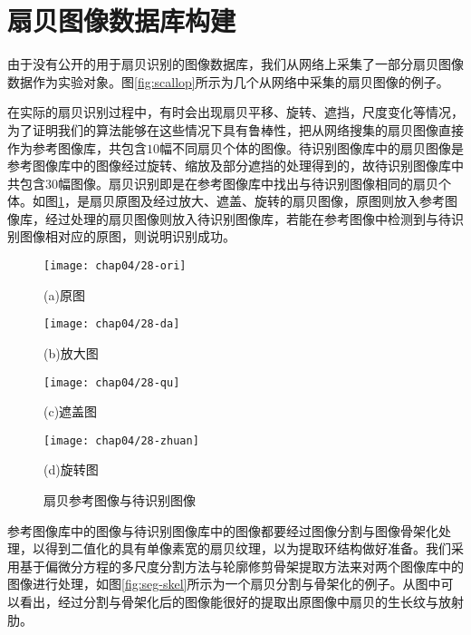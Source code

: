 \section{扇贝图像数据库构建}
\label{}
由于没有公开的用于扇贝识别的图像数据库，我们从网络上采集了一部分扇贝图像数据作为实验对象。图\ref{fig:scallop}所示为几个从网络中采集的扇贝图像的例子。

在实际的扇贝识别过程中，有时会出现扇贝平移、旋转、遮挡，尺度变化等情况，为了证明我们的算法能够在这些情况下具有鲁棒性，把从网络搜集的扇贝图像直接作为参考图像库，共包含$10$幅不同扇贝个体的图像。待识别图像库中的扇贝图像是参考图像库中的图像经过旋转、缩放及部分遮挡的处理得到的，故待识别图像库中共包含$30$幅图像。扇贝识别即是在参考图像库中找出与待识别图像相同的扇贝个体。如图\ref{fig:process}，是扇贝原图及经过放大、遮盖、旋转的扇贝图像，原图则放入参考图像库，经过处理的扇贝图像则放入待识别图像库，若能在参考图像中检测到与待识别图像相对应的原图，则说明识别成功。

\begin{figure}
\centering
  \begin{minipage}[b]{0.48\textwidth} 
      \centering 
      \texttt{[image: chap04/28-ori]}
        \centerline{(a)原图}\medskip
    \end{minipage}
  \begin{minipage}[b]{0.48\textwidth}
    \centering
    \texttt{[image: chap04/28-da]}
      \centerline{(b)放大图}\medskip
    \end{minipage}
  \begin{minipage}[b]{0.48\textwidth} 
      \centering 
      \texttt{[image: chap04/28-qu]}
        \centerline{(c)遮盖图}\medskip
    \end{minipage}
  \begin{minipage}[b]{0.48\textwidth}
    \centering
    \texttt{[image: chap04/28-zhuan]}
      \centerline{(d)旋转图}\medskip
  \end{minipage}
\caption{扇贝参考图像与待识别图像}
\label{fig:process}
\end{figure}

参考图像库中的图像与待识别图像库中的图像都要经过图像分割与图像骨架化处理，以得到二值化的具有单像素宽的扇贝纹理，以为提取环结构做好准备。我们采用基于偏微分方程的多尺度分割方法与轮廓修剪骨架提取方法来对两个图像库中的图像进行处理，如图\ref{fig:seg-skel}所示为一个扇贝分割与骨架化的例子。从图中可以看出，经过分割与骨架化后的图像能很好的提取出原图像中扇贝的生长纹与放射肋。


